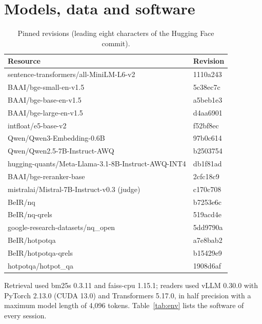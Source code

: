 \section{Models, data and software}\label{app:repro}
\begin{table}[h]
\centering
\small
\caption{Pinned revisions (leading eight characters of the Hugging Face commit).}
\label{tab:revisions}
\begin{tabular}{ll}
\toprule
Resource & Revision \\
\midrule
sentence-transformers/all-MiniLM-L6-v2 & 1110a243 \\
BAAI/bge-small-en-v1.5 & 5c38ec7c \\
BAAI/bge-base-en-v1.5 & a5beb1e3 \\
BAAI/bge-large-en-v1.5 & d4aa6901 \\
intfloat/e5-base-v2 & f52bf8ec \\
Qwen/Qwen3-Embedding-0.6B & 97b0c614 \\
Qwen/Qwen2.5-7B-Instruct-AWQ & b2503754 \\
hugging-quants/Meta-Llama-3.1-8B-Instruct-AWQ-INT4 & db1f81ad \\
BAAI/bge-reranker-base & 2cfc18c9 \\
mistralai/Mistral-7B-Instruct-v0.3 (judge) & c170c708 \\
BeIR/nq & b7253e6c \\
BeIR/nq-qrels & 519acd4e \\
google-research-datasets/nq\_open & 5dd9790a \\
BeIR/hotpotqa & a7e8bab2 \\
BeIR/hotpotqa-qrels & b15429e9 \\
hotpotqa/hotpot\_qa & 1908d6af \\
\bottomrule
\end{tabular}
\end{table}

Retrieval used bm25s 0.3.11 and faiss-cpu 1.15.1; readers used vLLM 0.30.0 with PyTorch 2.13.0 (CUDA 13.0) and Transformers 5.17.0, in half precision with a maximum model length of 4,096 tokens. Table~\ref{tab:env} lists the software of every session.





